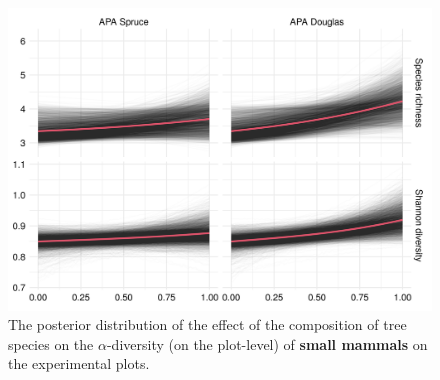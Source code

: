 \documentclass{article}
\begin{document}
\begin{figure}[ht!]
\centering
\includegraphics[width=.7\linewidth]{figures/rtg-diversity-sma-apa}
\caption{The posterior distribution of the effect of the composition of tree species on the $\alpha$-diversity (on the plot-level) of \textbf{small mammals} on the experimental plots.}
\label{fig:rtg-diversity-sma-apa}
\end{figure}
\end{document}
